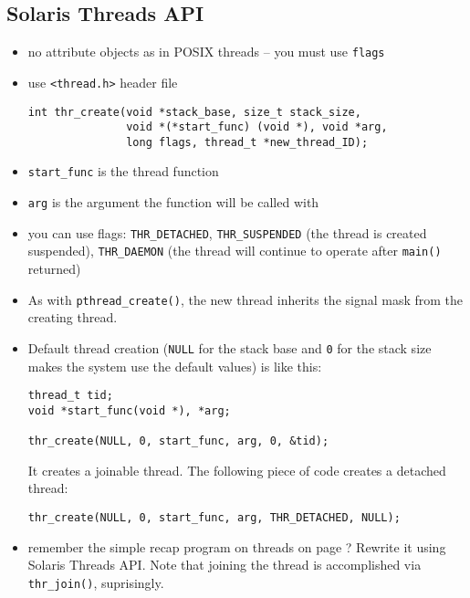 
\subsection{Solaris Threads API}

\begin{itemize}
\item no attribute objects as in POSIX threads -- you must use \texttt{flags}
\item use \texttt{<thread.h>} header file

\begin{verbatim}
int thr_create(void *stack_base, size_t stack_size,
               void *(*start_func) (void *), void *arg,
               long flags, thread_t *new_thread_ID);
\end{verbatim}

\item \texttt{start\_func} is the thread function
\item \texttt{arg} is the argument the function will be called with
\item you can use flags: \texttt{THR\_DETACHED}, \texttt{THR\_SUSPENDED} (the
thread is created suspended), \texttt{THR\_DAEMON} (the thread will continue to
operate after \texttt{main()} returned)
\end{itemize}


\begin{itemize}
\item As with \texttt{pthread\_create()}, the new thread inherits the signal
mask from the creating thread.
\item Default thread creation (\texttt{NULL} for the stack base and \texttt{0}
for the stack size makes the system use the default values) is like this:

\begin{verbatim}
thread_t tid;
void *start_func(void *), *arg;

thr_create(NULL, 0, start_func, arg, 0, &tid);
\end{verbatim}

It creates a joinable thread. The following piece of code creates a
detached thread:

\begin{verbatim}
thr_create(NULL, 0, start_func, arg, THR_DETACHED, NULL);
\end{verbatim}
\item {} remember the simple recap program on threads on page
\pageref{THREAD_RECAP}? Rewrite it using Solaris Threads API. Note that joining
the thread is accomplished via \texttt{thr\_join()}, suprisingly.
\end{itemize}

